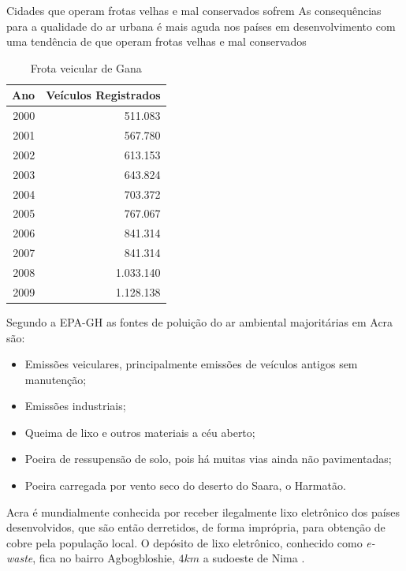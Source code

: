 Cidades que operam frotas velhas e mal conservados sofrem 
As consequências para a qualidade do ar urbana é mais aguda nos países em desenvolvimento
com uma tendência de que operam frotas velhas e mal conservados

\begin{table}[H]
 \centering
  \begin{tabular}{rr}
  \hline
  Ano & Veículos Registrados \\ 
  \hline
  2000 & 511.083 \\ 
  2001 & 567.780 \\ 
  2002 & 613.153 \\ 
  2003 & 643.824 \\ 
  2004 & 703.372 \\ 
  2005 & 767.067 \\ 
  2006 & 841.314 \\ 
  2007 & 841.314 \\ 
  2008 & 1.033.140 \\ 
  2009 & 1.128.138 \\ 
  \hline
  \end{tabular}
  \caption{Frota veicular de Gana \citep{dvla} \label{table:dvla}}
\end{table}

Segundo a EPA-GH \citep{epa2015} as fontes de poluição do ar ambiental 
majoritárias em Acra são:

\begin{itemize}
 \item Emissões veiculares, principalmente emissões de veículos antigos sem 
       manutenção;
 \item Emissões industriais;
 \item Queima de lixo e outros materiais a céu aberto;
 \item Poeira de ressupensão de solo, pois há muitas vias ainda não pavimentadas;
 \item Poeira carregada por vento seco do deserto do Saara, o Harmatão.
\end{itemize}

Acra é mundialmente conhecida por receber ilegalmente lixo 
eletrônico dos países desenvolvidos, que são então derretidos, de forma
imprópria, para obtenção de cobre pela população local. 
O depósito de lixo eletrônico, conhecido como \textit{e-waste}, 
fica no bairro Agbogbloshie, $4 km$ a sudoeste de Nima
\citep{asampong2015}.

